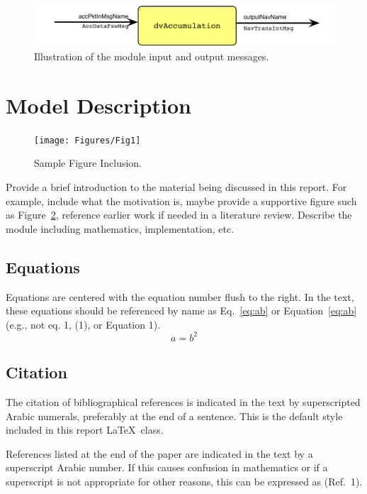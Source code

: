 

\begin{figure}[h]
	\centerline{
		\includegraphics{Figures/moduleImg}
	}
	\caption{Illustration of the module input and output messages.}
	\label{fig:moduleImg}
\end{figure}


\section{Model Description}

\begin{figure}[t]
	\centerline{
		\texttt{[image: Figures/Fig1]}
	}
	\caption{Sample Figure Inclusion.}
	\label{fig:Fig1}
\end{figure}

Provide a brief introduction to the material being discussed in this report.  For example, include what the motivation is, maybe provide a supportive figure such as Figure~\ref{fig:Fig1}, reference earlier work if needed in a literature review.
Describe the module including mathematics, implementation, etc.

\subsection{Equations}
Equations are centered with the equation number flush to the right. In the text, these equations should be referenced by name as Eq.~\eqref{eq:ab} or Equation~\eqref{eq:ab} (e.g., not eq.  1, (1), or Equation 1).
\begin{equation}
	\label{eq:ab}
	a = b^{2}
\end{equation}

\subsection{Citation}
The citation of bibliographical references is indicated in the text by superscripted Arabic numerals, preferably at the end of a sentence.  This is the default style included in this report \LaTeX\ class.\cite{pines1973}

References listed at the end of the paper are indicated in the text by a superscript Arabic number. If this causes confusion in mathematics or if a superscript is not appropriate for other reasons, this can be expressed as (Ref.~1). 

